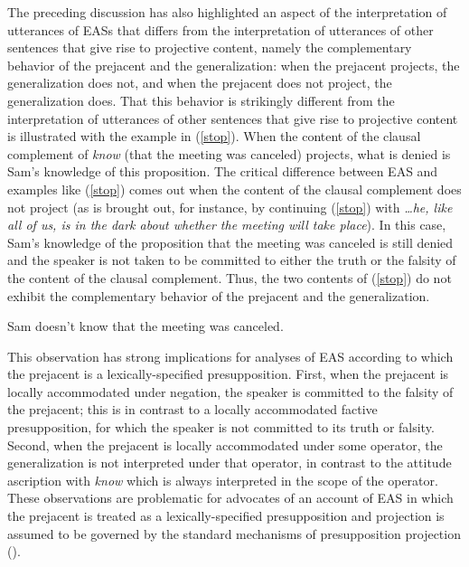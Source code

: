 \documentclass[11pt,fleqn]{article}
\newcommand{\6}{\mbox{$[\hspace*{-.6mm}[$}}
\newcommand{\9}{\mbox{$]\hspace*{-.6mm}]$}}
\begin{document}
The preceding discussion has also highlighted an aspect of the interpretation of utterances of EASs that differs from the interpretation of utterances of other sentences that give rise to projective content, namely the complementary behavior of the prejacent and the generalization: when the prejacent projects, the generalization does not, and when the prejacent does not project, the generalization does. That this behavior is strikingly different from the interpretation of utterances of other sentences that give rise to projective content is illustrated with the example in (\ref{stop}). When the content of the clausal complement of {\em know} (that the meeting was canceled) projects, what is denied is Sam's knowledge of this proposition. The critical difference between EAS and examples like (\ref{stop}) comes out when the content of the clausal complement does not project (as is brought out, for instance, by continuing (\ref{stop}) with {\em \ldots he, like all of us, is in the dark about whether the meeting will take place}). In this case, Sam's knowledge of the proposition that the meeting was canceled is still denied and the speaker is not taken to be committed to either the truth or the falsity of the content of the clausal complement. Thus, the two contents of (\ref{stop}) do not exhibit the complementary behavior of the prejacent and the generalization.

\begin{exe}
\ex\label{stop} Sam doesn't know that the meeting was canceled.
\end{exe}
This observation has strong implications for analyses of EAS according to which the prejacent is a lexically-specified presupposition. First, when the prejacent is locally accommodated under negation, the speaker is committed to the falsity of the prejacent; this is in contrast to a locally accommodated factive presupposition, for which the speaker is not committed to its truth or falsity. Second, when the prejacent is locally accommodated under some operator, the generalization is not interpreted under that operator, in contrast to the attitude ascription with {\em know} which is always interpreted in the scope of the operator. These observations are problematic for advocates of an account of EAS in which the prejacent is treated as a lexically-specified presupposition and projection is assumed to be governed by the standard mechanisms of presupposition projection (\citealt{heim83,vds92}).
\end{document}
